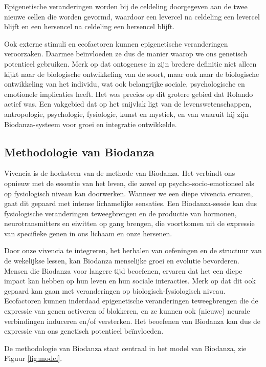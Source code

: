 \documentclass[
  11pt,
]{book}
\begin{document}
Epigenetische veranderingen worden bij de celdeling doorgegeven aan de twee nieuwe cellen die worden gevormd, waardoor een levercel na celdeling een levercel blijft en een hersencel na celdeling een hersencel blijft.

Ook externe stimuli en ecofactoren kunnen epigenetische veranderingen veroorzaken.
Daarmee beïnvloeden ze dus de manier waarop we ons genetisch potentieel gebruiken.
Merk op dat ontogenese in zijn bredere definitie niet alleen kijkt naar de biologische ontwikkeling van de soort, maar ook naar de biologische ontwikkeling van het individu, wat ook belangrijke sociale, psychologische en emotionele implicaties heeft. Het was precies op dit grotere gebied dat Rolando actief was. Een vakgebied dat op het snijvlak ligt van de levenswetenschappen, antropologie, psychologie, fysiologie, kunst en mystiek, en van waaruit hij zijn Biodanza-systeem voor groei en integratie ontwikkelde.

\hypertarget{methodologie-van-biodanza}{%
\subsection{Methodologie van Biodanza}\label{methodologie-van-biodanza}}

Vivencia is de hoeksteen van de methode van Biodanza. Het verbindt ons opnieuw met de essentie van het leven, die zowel op psycho-socio-emotioneel als op fysiologisch niveau kan doorwerken. Wanneer we een diepe vivencia ervaren, gaat dit gepaard met intense lichamelijke sensaties. Een Biodanza-sessie kan dus fysiologische veranderingen teweegbrengen en de productie van hormonen, neurotransmitters en eiwitten op gang brengen, die voortkomen uit de expressie van specifieke genen in ons lichaam en onze hersenen.

Door onze vivencia te integreren, het herhalen van oefeningen en de structuur van de wekelijkse lessen, kan Biodanza menselijke groei en evolutie bevorderen. Mensen die Biodanza voor langere tijd beoefenen, ervaren dat het een diepe impact kan hebben op hun leven en hun sociale interacties. Merk op dat dit ook gepaard kan gaan met veranderingen op biologisch-fysiologisch niveau. Ecofactoren kunnen inderdaad epigenetische veranderingen teweegbrengen die de expressie van genen activeren of blokkeren, en ze kunnen ook (nieuwe) neurale verbindingen induceren en/of versterken. Het beoefenen van Biodanza kan dus de expressie van ons genetisch potentieel beïnvloeden.

De methodologie van Biodanza staat centraal in het model van Biodanza, zie Figuur \ref{fig:model}.
\end{document}
